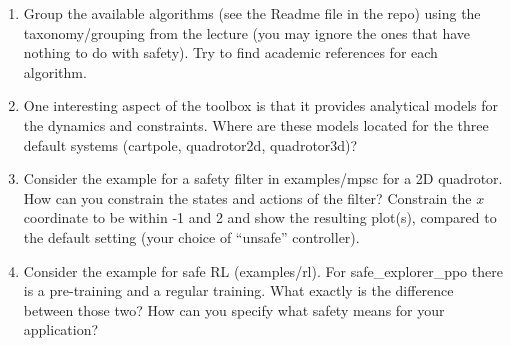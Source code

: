 \begin{enumerate}
\item Group the available algorithms (see the Readme file in the repo) using the taxonomy/grouping from the lecture (you may ignore the ones that have nothing to do with safety). Try to find academic references for each algorithm.


\item One interesting aspect of the toolbox is that it provides analytical models for the dynamics and constraints. Where are these models located for the three default systems (cartpole, quadrotor2d, quadrotor3d)?


\item Consider the example for a safety filter in examples/mpsc for a 2D quadrotor. How can you constrain the states and actions of the filter? Constrain the $x$ coordinate to be within -1 and 2 and show the resulting plot(s), compared to the default setting (your choice of ``unsafe'' controller).


\item Consider the example for safe RL (examples/rl). For safe\_explorer\_ppo there is a pre-training and a regular training. What exactly is the difference between those two? How can you specify what safety means for your application?


\end{enumerate}



\ifthenelse{\isundefined{\scripthead}}{


}{}


\exerfoot
